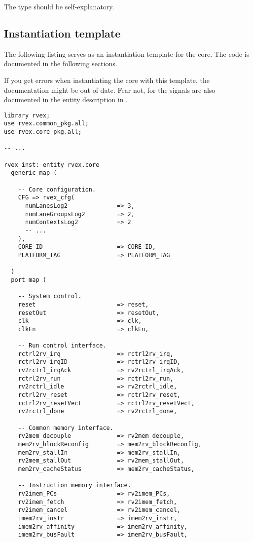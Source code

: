 The  type should be self-explanatory.

\subsection{Instantiation template}
\label{sec:core-ug-inst-template}

The following listing serves as an instantiation template for the core. The code
is documented in the following sections.

If you get errors when instantiating the core with this template, the
documentation might be out of date. Fear not, for the signals are also
documented in the entity description in .

\begin{lstlisting}[numbers=none, basicstyle=\tiny]
library rvex;
use rvex.common_pkg.all;
use rvex.core_pkg.all;

-- ...

rvex_inst: entity rvex.core
  generic map (
    
    -- Core configuration.
    CFG => rvex_cfg(
      numLanesLog2              => 3,
      numLaneGroupsLog2         => 2,
      numContextsLog2           => 2
      -- ...
    ),
    CORE_ID                     => CORE_ID,
    PLATFORM_TAG                => PLATFORM_TAG
    
  )
  port map (
    
    -- System control.
    reset                       => reset,
    resetOut                    => resetOut,
    clk                         => clk,
    clkEn                       => clkEn,
    
    -- Run control interface.
    rctrl2rv_irq                => rctrl2rv_irq,
    rctrl2rv_irqID              => rctrl2rv_irqID,
    rv2rctrl_irqAck             => rv2rctrl_irqAck,
    rctrl2rv_run                => rctrl2rv_run,
    rv2rctrl_idle               => rv2rctrl_idle,
    rctrl2rv_reset              => rctrl2rv_reset,
    rctrl2rv_resetVect          => rctrl2rv_resetVect,
    rv2rctrl_done               => rv2rctrl_done,
    
    -- Common memory interface.
    rv2mem_decouple             => rv2mem_decouple,
    mem2rv_blockReconfig        => mem2rv_blockReconfig,
    mem2rv_stallIn              => mem2rv_stallIn,
    rv2mem_stallOut             => rv2mem_stallOut,
    mem2rv_cacheStatus          => mem2rv_cacheStatus,
    
    -- Instruction memory interface.
    rv2imem_PCs                 => rv2imem_PCs,
    rv2imem_fetch               => rv2imem_fetch,
    rv2imem_cancel              => rv2imem_cancel,
    imem2rv_instr               => imem2rv_instr,
    imem2rv_affinity            => imem2rv_affinity,
    imem2rv_busFault            => imem2rv_busFault,
    

\end{lstlisting}
